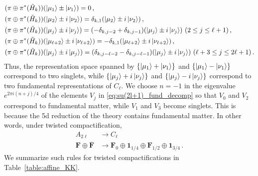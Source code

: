 \begin{align}
&(\pi \oplus \pi^*(\tilde{H}_k)) (\ket{\mu_1} \pm \ket{\nu_1}) = 0 \, , \\
&(\pi \oplus \pi^*(\tilde{H}_k)) (\ket{\mu_2} \pm i\ket{\nu_2}) = \delta_{k,1} (\ket{\mu_2} \pm i\ket{\nu_2}) \, , \nonumber \\
&(\pi \oplus \pi^*(\tilde{H}_k)) (\ket{\mu_j} \pm i\ket{\nu_j}) = (-\delta_{k,j-2} + \delta_{k,j-1}) (\ket{\mu_j} \pm i\ket{\nu_j}) \ (2 \leq j \leq \ell+1) \, , \nonumber \\
&(\pi \oplus \pi^*(\tilde{H}_k)) (\ket{\mu_{\ell+2}} \pm i\ket{\nu_{\ell+2}}) = -\delta_{k,1} (\ket{\mu_{\ell+2}} \pm i\ket{\nu_{\ell+2}}) \, , \nonumber \\
&(\pi \oplus \pi^*(\tilde{H}_k)) (\ket{\mu_j} \pm i\ket{\mu_j}) = (\delta_{k,j-\ell-2} - \delta_{k,j-\ell-1}) (\ket{\mu_j} \pm i\ket{\nu_j}) \ (\ell+3 \leq j \leq 2\ell+1) \, .\nonumber
\end{align}
Thus, the representation space spanned by $ \{\ket{\mu_1} + \ket{\nu_1} \} $ and $ \{\ket{\mu_1} - \ket{\nu_1} \} $ correspond to two singlets, while $ \{\ket{\mu_j} + i\ket{\nu_j} \} $ and $ \{\ket{\mu_j} - i\ket{\nu_j} \} $ correspond to two fundamental representations of $ C_\ell $. We choose $ n = -1 $ in the eigenvalue $e^{2\pi i (n+j)/4}$ of the elements $V_j$ in \eqref{eq:su(2l+1)_fund_decomp} so that $ V_0 $ and $ V_2 $ correspond to fundamental matter, while $ V_1 $ and $ V_3 $ become singlets. This is because the 5d reduction of the theory contains fundamental matter. In other words, under twisted compactification,
\begin{align}
A_{2\ell} &\to C_\ell \nonumber \\
\mathbf{F} \oplus \overline{\mathbf{F}} &\to \mathbf{F}_0 \oplus \mathbf{1}_{1/4} \oplus \mathbf{F}_{1/2} \oplus \mathbf{1}_{3/4} \, .
\end{align}
We summarize such rules for twisted compactifications in Table~\ref{table:affine_KK}.
